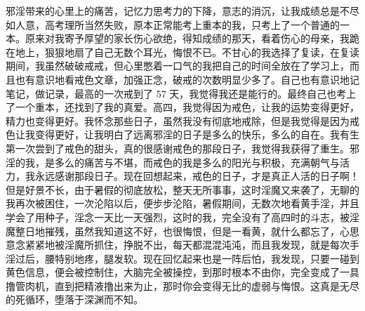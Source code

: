 \begin{case}
    邪淫带来的心里上的痛苦，记忆力思考力的下降，意志的消沉，让我成绩总是不尽如人意，高考理所当然失败，原本正常能考上重本的我，只考上了一个普通的一本。原来对我寄予厚望的家长伤心欲绝，得知成绩的那天，看着伤心的母亲，我跪在地上，狠狠地扇了自己无数个耳光，悔恨不已。不甘心的我选择了复读，在复读期间，我虽然破破戒戒，但心里憋着一口气的我把自己的时间全放在了学习上，而且也有意识地看戒色文章，加强正念，破戒的次数明显少多了。自己也有意识地记笔记，做记录，最高的一次戒到了 57 天，我觉得我还是能行的。最终自己也考上了一个重本，还找到了我的真爱。高四，我觉得因为戒色，让我的运势变得更好，精力也变得更好。我怀念那些日子，虽然我没有彻底地戒除，但是我觉得是因为戒色让我变得更好，让我明白了远离邪淫的日子是多么的快乐，多么的自在。我有生第一次尝到了戒色的甜头，真的很感谢戒色的那段日子，我觉得我获得了重生。邪淫的我，是多么的痛苦与不堪，而戒色的我是多么的阳光与积极，充满朝气与活力，我永远感谢那段日子。现在回想起来，戒色的日子，才是真正人活的日子啊！但是好景不长，由于暑假的彻底放松，整天无所事事，这时淫魔又来袭了，无聊的我再次被困住，一次沦陷以后，便步步沦陷，暑假期间，无数次地看黄手淫，并且学会了用种子，淫念一天比一天强烈，这时的我，完全没有了高四时的斗志，被淫魔整日地摧残，虽然我知道这不好，也很悔恨，但是一看黄，就什么都忘了，心思意念紧紧地被淫魔所抓住，挣脱不出，每天都混混沌沌，而且我发现，就是每次手淫过后，腰特别地疼，腿发软。现在回忆起来也是一阵后怕，我发现，只要一碰到黄色信息，便会被控制住，大脑完全被操控，到那时根本不由你，完全变成了一具撸管肉机，直到把精液撸出来为止，那时你会变得无比的虚弱与悔恨。这真是无尽的死循环，堕落于深渊而不知。

\end{case}
